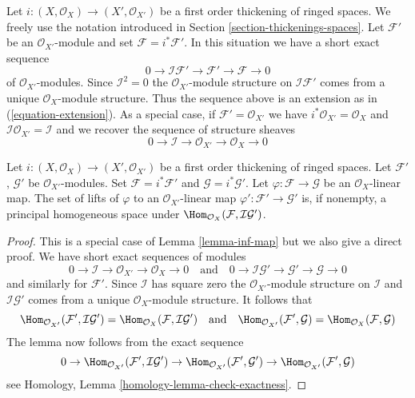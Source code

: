 \noindent
Let $i : (X, \mathcal{O}_X) \to (X', \mathcal{O}_{X'})$ be a first
order thickening of ringed spaces. We freely use the notation introduced in
Section \ref{section-thickenings-spaces}.
Let $\mathcal{F}'$ be an $\mathcal{O}_{X'}$-module
and set $\mathcal{F} = i^*\mathcal{F}'$.
In this situation we have a short exact sequence
$$
0 \to \mathcal{I}\mathcal{F}' \to \mathcal{F}' \to \mathcal{F} \to 0
$$
of $\mathcal{O}_{X'}$-modules. Since $\mathcal{I}^2 = 0$ the
$\mathcal{O}_{X'}$-module structure on $\mathcal{I}\mathcal{F}'$
comes from a unique $\mathcal{O}_X$-module structure.
Thus the sequence above is an extension as in (\ref{equation-extension}).
As a special case, if $\mathcal{F}' = \mathcal{O}_{X'}$ we have
$i^*\mathcal{O}_{X'} = \mathcal{O}_X$ and
$\mathcal{I}\mathcal{O}_{X'} = \mathcal{I}$ and we recover the
sequence of structure sheaves
$$
0 \to \mathcal{I} \to \mathcal{O}_{X'} \to \mathcal{O}_X \to 0
$$

\begin{lemma}
\label{lemma-inf-map-special}
Let $i : (X, \mathcal{O}_X) \to (X', \mathcal{O}_{X'})$
be a first order thickening of ringed spaces.
Let $\mathcal{F}'$, $\mathcal{G}'$ be $\mathcal{O}_{X'}$-modules.
Set $\mathcal{F} = i^*\mathcal{F}'$ and $\mathcal{G} = i^*\mathcal{G}'$.
Let $\varphi : \mathcal{F} \to \mathcal{G}$ be an $\mathcal{O}_X$-linear map.
The set of lifts of $\varphi$ to an $\mathcal{O}_{X'}$-linear map
$\varphi' : \mathcal{F}' \to \mathcal{G}'$ is, if nonempty, a principal
homogeneous space under
$\Hom_{\mathcal{O}_X}(\mathcal{F}, \mathcal{I}\mathcal{G}')$.
\end{lemma}

\begin{proof}
This is a special case of Lemma \ref{lemma-inf-map} but we also
give a direct proof. We have short exact sequences of modules
$$
0 \to \mathcal{I} \to \mathcal{O}_{X'} \to \mathcal{O}_X \to 0
\quad\text{and}\quad
0 \to \mathcal{I}\mathcal{G}' \to \mathcal{G}' \to \mathcal{G} \to 0
$$
and similarly for $\mathcal{F}'$.
Since $\mathcal{I}$ has square zero the $\mathcal{O}_{X'}$-module
structure on $\mathcal{I}$ and $\mathcal{I}\mathcal{G}'$ comes from
a unique $\mathcal{O}_X$-module structure. It follows that
$$
\Hom_{\mathcal{O}_{X'}}(\mathcal{F}', \mathcal{I}\mathcal{G}') =
\Hom_{\mathcal{O}_X}(\mathcal{F}, \mathcal{I}\mathcal{G}')
\quad\text{and}\quad
\Hom_{\mathcal{O}_{X'}}(\mathcal{F}', \mathcal{G}) =
\Hom_{\mathcal{O}_X}(\mathcal{F}, \mathcal{G})
$$
The lemma now follows from the exact sequence
$$
0 \to \Hom_{\mathcal{O}_{X'}}(\mathcal{F}', \mathcal{I}\mathcal{G}') \to
\Hom_{\mathcal{O}_{X'}}(\mathcal{F}', \mathcal{G}') \to
\Hom_{\mathcal{O}_{X'}}(\mathcal{F}', \mathcal{G})
$$
see Homology, Lemma \ref{homology-lemma-check-exactness}.
\end{proof}

